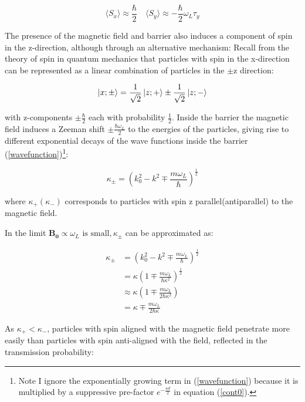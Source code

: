 \documentclass{article}
\begin{document}
\begin{equation}
	\langle S_x \rangle \approx \frac{\hbar}{2} \quad \langle S_y \rangle \approx -\frac{\hbar}{2}\omega_L\tau_y
\end{equation}

\noindent The presence of the magnetic field and barrier also induces a component of spin in the z-direction, although through an alternative mechanism: Recall from the theory of spin in quantum mechanics that particles with spin in the x-direction can be represented as a linear combination of particles in the $\pm \text{z}$ direction:

\begin{equation}
	\ket{x; \pm} = \frac{1}{\sqrt{2}}\ket{z;+} \pm \frac{1}{\sqrt{2}}\ket{z;-}
\end{equation}

\noindent with z-components $\pm \frac{\hbar}{2}$ each with probability $\frac{1}{2}$. Inside the barrier the magnetic field induces a Zeeman shift $\pm \frac{\hbar\omega_L}{2}$ to the energies of the particles, giving rise to different exponential decays of the wave functions inside the barrier (\ref{wavefunction})\footnote{Note I ignore the exponentially growing term in (\ref{wavefunction}) because it is multiplied by a suppressive pre-factor $e^{-\frac{\kappa d}{2}}$ in equation (\ref{cont0}).}:

\begin{equation}
	\kappa_{\pm}=(k_0^2-k^2\mp \frac{m\omega_L}{\hbar})^{\frac{1}{2}}
\end{equation}

\noindent where $\kappa_{+}(\kappa_{-})$ corresponds to particles with spin z parallel(antiparallel) to the magnetic field.

\noindent In the limit $\boldsymbol{B_0} \propto \omega_L \text{ is small}, \kappa_{\pm}$ can be approximated as:

\begin{align}
   \kappa_{\pm} &= \left(k^{2}_{0}-k^{2} \mp \frac{m \omega_{L}}{\hbar}\right)^{\frac{1}{2}}\\	
		&= \kappa \left(1 \mp \frac{m \omega_{L}}{\hbar \kappa^{2}}\right)^{\frac{1}{2}}\\
		&\approx \kappa \left(1 \mp \frac{m \omega_{L}}{2\hbar \kappa^{2}}\right)\\
		&= \kappa \mp \frac{m \omega_{L}}{2\hbar \kappa} \label{smallfieldkappa}
\end{align}

\noindent As $\kappa_{+} < \kappa_{-}$, particles with spin aligned with the magnetic field penetrate more easily than particles with spin anti-aligned with the field, reflected in the transmission probability:
\end{document}
